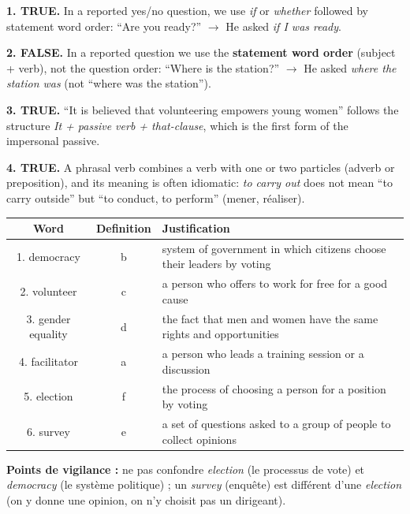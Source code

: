 \documentclass[11pt]{article}
\begin{document}
\begin{corrige}

\textbf{1. TRUE.} In a reported yes/no question, we use \emph{if} or \emph{whether} followed by statement word order: ``Are you ready?'' $\rightarrow$ He asked \emph{if I was ready}.

\textbf{2. FALSE.} In a reported question we use the \textbf{statement word order} (subject + verb), not the question order: ``Where is the station?'' $\rightarrow$ He asked \emph{where the station was} (not ``where was the station'').

\textbf{3. TRUE.} ``It is believed that volunteering empowers young women'' follows the structure \emph{It + passive verb + that-clause}, which is the first form of the impersonal passive.

\textbf{4. TRUE.} A phrasal verb combines a verb with one or two particles (adverb or preposition), and its meaning is often idiomatic: \emph{to carry out} does not mean ``to carry outside'' but ``to conduct, to perform'' (mener, réaliser).
\end{corrige}

\begin{corrige}

\begin{center}
\begin{tabular}{|c|c|l|}\hline
\textbf{Word} & \textbf{Definition} & \textbf{Justification} \\ \hline
1. democracy & b & system of government in which citizens choose their leaders by voting \\
2. volunteer & c & a person who offers to work for free for a good cause \\
3. gender equality & d & the fact that men and women have the same rights and opportunities \\
4. facilitator & a & a person who leads a training session or a discussion \\
5. election & f & the process of choosing a person for a position by voting \\
6. survey & e & a set of questions asked to a group of people to collect opinions \\ \hline
\end{tabular}
\end{center}

\textbf{Points de vigilance :} ne pas confondre \emph{election} (le processus de vote) et \emph{democracy} (le système politique) ; un \emph{survey} (enquête) est différent d'une \emph{election} (on y donne une opinion, on n'y choisit pas un dirigeant).
\end{corrige}
\end{document}
